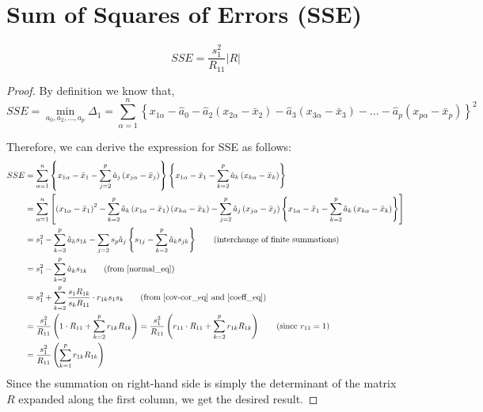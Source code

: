 \documentclass[10pt]{article}
\begin{document}
\section{Sum of Squares of Errors (SSE)}
\begin{proposition}
\begin{equation}
	SSE = \frac{ s_1^2 }{ R_{11} } |R| \label{sse_eq}
\end{equation}
\end{proposition}

\begin{proof}
By definition we know that,
\[ SSE = \min_{a_{0}, a_2, \dots, a_p} \Delta_{1} = \sum_{\alpha = 1}^{n} \left\{ x_{1 \alpha} - \hat{a}_{0} - \hat{a}_2 \left( x_{2 \alpha } - \bar{x}_{2} \right)  - \hat{a}_3 \left( x_{3 \alpha } - \bar{x}_{3} \right) - \dots - \hat{a}_p \left( x_{p \alpha } - \bar{x}_{p} \right)\right\} ^{2} \] 

Therefore, we can derive the expression for SSE as follows:
\begin{align*}
	SSE &= \sum_{\alpha = 1}^{n} \left\{ x_{1 \alpha} - \bar{x}_{1} - \sum_{j=2}^{p} \hat{a}_{j} \left( x_{j \alpha} - \bar{x}_{j} \right)  \right\} 
    \left\{ x_{1\alpha} - \bar{x}_1 - \sum_{k=2}^{p} \hat{a}_k \left( x_{k\alpha} - \bar{x}_k \right)  \right\} \\
	    &= \sum_{\alpha = 1}^{n} \left[ \left( x_{1\alpha} - \bar{x}_1 \right) ^{2} 
	    - \sum_{k=2}^{p}\hat{a}_k \left( x_{1\alpha} - \bar{x}_1 \right) \left( x_{k\alpha} - \bar{x}_k \right) 
	     - \sum_{j=2}^{p} \hat{a}_j \left( x_{j\alpha} - \bar{x}_j \right) 
    \left\{ x_{1\alpha} - \bar{x}_1 - \sum_{k=2}^{p} \hat{a}_k \left( x_{k\alpha} - \bar{x}_k \right)  \right\} \right] \\
	    &= s_{1}^{2} - \sum_{k=2}^{p} \hat{a}_k s_{1k} - \sum_{j= 2}s_{p} \hat{a}_j \left\{ s_{1j} - \sum_{k=2}^{p} \hat{a}_k s_{jk} \right\} \tag*{(interchange of finite summations)} \\
	    &= s_{1}^{2} - \sum_{k=2}^{p} \hat{a}_k s_{1k} \tag*{(from \eqref{normal_eq})} \\
	    &= s_1^2 + \sum_{k=2}^{p} \frac{ s_1 R_{1k} }{ s_k R_{11}  } \cdot r_{1k} s_1 s_k \tag*{(from \eqref{cov-cor_eq} and \eqref{coeff_eq})} \\
	    &= \frac{ s_1^2 }{ R_{11} } \left( 1 \cdot R_{11} + \sum_{k=2}^{p} r_{1k}R_{1k} \right) = \frac{ s_1^2 }{ R_{11} } \left( r_{11} \cdot R_{11} + \sum_{k=2}^{p} r_{1k}R_{1k} \right) \tag*{(since \( r_{11} = 1 \))} \\
	    &= \frac{ s_1^2 }{ R_{11} } \left( \sum_{k=1}^{p} r_{1k}R_{1k} \right)
\end{align*}
Since the summation on right-hand side is simply the determinant of the matrix $ R $ expanded along the first column, we get the desired result. 
\end{proof}
\end{document}
